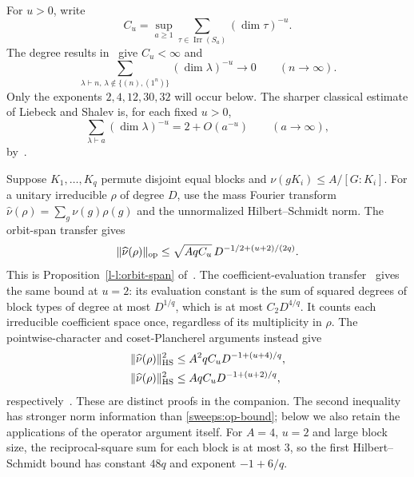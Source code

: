 For $u>0$, write
\[
 C_u=\sup_{a\ge1}\sum_{\tau\in\operatorname{Irr}(S_a)}(\dim\tau)^{-u}.
\]
The degree results in~\cite[Lemma~\ref*{l-l:degree-reciprocal-two}
and Theorem~\ref*{l-l:degree-all-powers}]{partialFourier} give $C_u<\infty$ and
\begin{equation}\label{sweeps:degree-input}
 \sum_{\lambda\vdash n,\,\lambda\notin\{(n),(1^n)\}}
                (\dim\lambda)^{-u}\longrightarrow0
 \qquad(n\longrightarrow\infty).
\end{equation}
Only the exponents $2,4,12,30,32$ will occur below.  The sharper
classical estimate of Liebeck and Shalev is, for each fixed $u>0$,
\begin{equation}\label{sweeps:LS}
 \sum_{\lambda\vdash a}(\dim\lambda)^{-u}=2+O(a^{-u})
 \qquad(a\longrightarrow\infty),
\end{equation}
by~\cite[Theorem~2.6]{liebeck-shalev2004}.

Suppose $K_1,\ldots,K_q$ permute disjoint equal blocks and
$\nu(gK_i)\le A/[G:K_i]$.  For a unitary irreducible $\rho$ of degree
$D$, use the mass Fourier transform
$\widehat\nu(\rho)=\sum_g\nu(g)\rho(g)$ and the unnormalized
Hilbert--Schmidt norm.  The orbit-span transfer gives
\begin{equation}\label{sweeps:op-bound}
 \|\widehat\nu(\rho)\|_{\rm op}
 \le\sqrt{AqC_u}\,D^{-1/2+(u+2)/(2q)}
 .
\end{equation}
This is Proposition~\ref*{l-l:orbit-span} of~\cite{partialFourier}.
The coefficient-evaluation transfer~\cite[Proposition~\ref*{l-l:coefficient-operator}]{partialFourier} gives the same bound
at $u=2$: its evaluation constant is the sum of squared degrees of
block types of degree at most $D^{1/q}$, which is at most
$C_2D^{4/q}$.  It counts each irreducible coefficient space once,
regardless of its multiplicity in $\rho$.
The pointwise-character and coset-Plancherel arguments instead give
\begin{align}
 \|\widehat\nu(\rho)\|_{\rm HS}^2
 &\le A^2qC_u D^{-1+(u+4)/q},\label{sweeps:pointwise-HS-eq}\\
 \|\widehat\nu(\rho)\|_{\rm HS}^2
 &\le AqC_u D^{-1+(u+2)/q},\label{sweeps:coset-HS-eq}
\end{align}
respectively~\cite[Propositions~\ref*{l-l:coarse-character-lift}
and~\ref*{l-l:isotypic}]{partialFourier}.
These are distinct proofs in the companion.  The second inequality
has stronger norm information than \eqref{sweeps:op-bound}; below we
also retain the applications of the operator argument itself.
For $A=4$, $u=2$ and large block size, the reciprocal-square sum for
each block is at most $3$, so the first Hilbert--Schmidt bound has
constant $48q$ and exponent $-1+6/q$.

